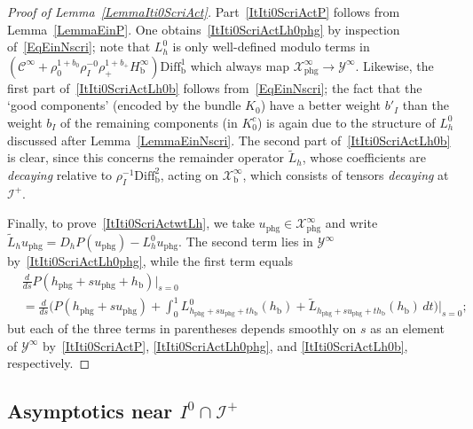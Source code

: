 \documentclass[reqno,11pt,letterpaper]{amsart}
\numberwithin{equation}{section}
\numberwithin{figure}{section}
\theoremstyle{definition}
\theoremstyle{remark}
\newcommand{\mc}{\mathcal}
\newcommand{\cC}{\mc C}
\newcommand{\cX}{\mc X}
\newcommand{\cY}{\mc Y}
\newcommand{\ms}{\mathscr}
\newcommand{\scri}{\ms I}
\newcommand{\wt}{\widetilde}
\newcommand{\bop}{{\mathrm{b}}}
\newcommand{\Diff}{\mathrm{Diff}}
\newcommand{\Diffb}{\Diff_\bop}
\newcommand{\CI}{\cC^\infty}
\newcommand{\Hb}{H_{\bop}}
\newcommand{\phg}{{\mathrm{phg}}}
\newcommand{\usref}[1]{{\upshape\ref{#1}}}
\begin{document}
\begin{proof}[Proof of Lemma~\usref{LemmaIti0ScriAct}]
  Part~\eqref{ItIti0ScriActP} follows from Lemma~\ref{LemmaEinP}. One obtains~\eqref{ItIti0ScriActLh0phg} by inspection of~\eqref{EqEinNscri}; note that $L_h^0$ is only well-defined modulo terms in $(\CI+\rho_0^{1+b_0}\rho_I^{-0}\rho_+^{1+b_+}\Hb^\infty)\Diffb^1$ which always map $\cX^\infty_\phg\to\cY^\infty$. Likewise, the first part of~\eqref{ItIti0ScriActLh0b} follows from~\eqref{EqEinNscri}; the fact that the `good components' (encoded by the bundle $K_0$) have a better weight $b'_I$ than the weight $b_I$ of the remaining components (in $K_0^c$) is again due to the structure of $L_h^0$ discussed after Lemma~\ref{LemmaEinNscri}. The second part of~\eqref{ItIti0ScriActLh0b} is clear, since this concerns the remainder operator $\wt L_h$, whose coefficients are \emph{decaying} relative to $\rho_I^{-1}\Diffb^2$, acting on $\cX^\infty_\bop$, which consists of tensors \emph{decaying} at $\scri^+$.
  
  Finally, to prove~\eqref{ItIti0ScriActwtLh}, we take $u_\phg\in\cX^\infty_\phg$ and write $\wt L_h u_\phg=D_h P(u_\phg)-L_h^0 u_\phg$. The second term lies in $\cY^\infty$ by~\eqref{ItIti0ScriActLh0phg}, while the first term equals
  \begin{align*}
    &\frac{d}{d s}P(h_\phg+s u_\phg+h_\bop)\big|_{s=0} \\
    &=\frac{d}{d s}\biggl(P(h_\phg+s u_\phg) + \int_0^1 L^0_{h_\phg+s u_\phg+t h_\bop}(h_\bop) + \wt L_{h_\phg+s u_\phg+t h_\bop}(h_\bop)\,dt \biggr)\biggr|_{s=0};
  \end{align*}
  but each of the three terms in parentheses depends smoothly on $s$ as an element of $\cY^\infty$ by~\eqref{ItIti0ScriActP}, \eqref{ItIti0ScriActLh0phg}, and \eqref{ItIti0ScriActLh0b}, respectively.
\end{proof}


\subsection{Asymptotics near \texorpdfstring{$I^0\cap\scri^+$}{the past boundary of the radiation face}}
\label{SsIti0Scri}
\end{document}
